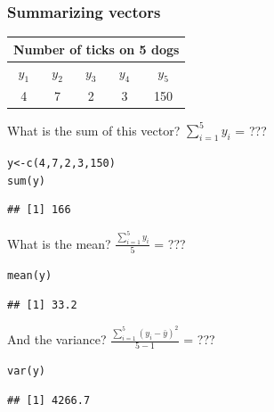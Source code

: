 \documentclass[color=usenames,dvipsnames]{beamer}\usepackage[]{graphicx}\usepackage[]{color}
\makeatletter
\newcommand{\hlnum}[1]{\textcolor[rgb]{0.69,0.494,0}{#1}}%
\newcommand{\hlstd}[1]{\textcolor[rgb]{0,0,0}{#1}}%
\newcommand{\hlkwb}[1]{\textcolor[rgb]{0,0.341,0.682}{#1}}%
\newcommand{\hlkwd}[1]{\textcolor[rgb]{0.004,0.004,0.506}{#1}}%
\newenvironment{kframe}{%
 \def\at@end@of@kframe{}%
 \ifinner\ifhmode%
  \def\at@end@of@kframe{\end{minipage}}%
  \begin{minipage}{\columnwidth}%
 \fi\fi%
 \def\FrameCommand##1{\hskip\@totalleftmargin \hskip-\fboxsep
 \colorbox{shadecolor}{##1}\hskip-\fboxsep
     \hskip-\linewidth \hskip-\@totalleftmargin \hskip\columnwidth}%
 \MakeFramed {\advance\hsize-\width
   \@totalleftmargin\z@ \linewidth\hsize
   \@setminipage}}%
 {\par\unskip\endMakeFramed%
 \at@end@of@kframe}
\newenvironment{knitrout}{}{} %
\makeatother
\begin{document}
\begin{frame}[fragile]
  \frametitle{Summarizing vectors}
  \small
  \begin{center}
    \begin{tabular}{ccccc}
      \hline
      \multicolumn{5}{c}{Number of ticks on 5 dogs} \\
      \hline %
      $y_1$ & $y_2$ & $y_3$ & $y_4$ & $y_5$ \\
      \hline
      4 & 7 & 2 & 3 & 150 \\
      \hline
    \end{tabular}
  \end{center}
What is the sum of this vector? $\sum_{i=1}^5 y_i$ = ???
  \pause
\begin{knitrout}\footnotesize
{}\color{fgcolor}\begin{kframe}
\begin{alltt}
\hlstd{y} \hlkwb{<-} \hlkwd{c}\hlstd{(}\hlnum{4}\hlstd{,}\hlnum{7}\hlstd{,}\hlnum{2}\hlstd{,}\hlnum{3}\hlstd{,}\hlnum{150}\hlstd{)}
\hlkwd{sum}\hlstd{(y)}
\end{alltt}
\begin{verbatim}
## [1] 166
\end{verbatim}
\end{kframe}
\end{knitrout}
\pause
What is the mean? $\frac{\sum_{i=1}^5 y_i}{5}$ = ???
  \pause
\begin{knitrout}\footnotesize
{}\color{fgcolor}\begin{kframe}
\begin{alltt}
\hlkwd{mean}\hlstd{(y)}
\end{alltt}
\begin{verbatim}
## [1] 33.2
\end{verbatim}
\end{kframe}
\end{knitrout}
  \pause
  And the variance? $\frac{\sum_{i=1}^5 (y_i - \bar{y})^2}{5-1}$ = ???
\begin{knitrout}\footnotesize
{}\color{fgcolor}\begin{kframe}
\begin{alltt}
\hlkwd{var}\hlstd{(y)}
\end{alltt}
\begin{verbatim}
## [1] 4266.7
\end{verbatim}
\end{kframe}
\end{knitrout}
\end{frame}
\end{document}
